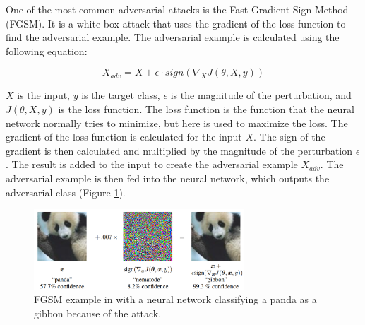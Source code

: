 One of the most common adversarial attacks is the Fast Gradient Sign Method (FGSM)\cite{goodfellow2015explaining}. It is a white-box attack that uses the gradient of the loss function to find the adversarial example. The adversarial example is calculated using the following equation:

\begin{equation}
    X_{adv} = X + \epsilon \cdot sign(\nabla_{X}J(\theta, X, y))
\end{equation}

$X$ is the input, $y$ is the target class, $\epsilon$ is the magnitude of the perturbation, and $J(\theta, X, y)$ is the loss function. The loss function is the function that the neural network normally tries to minimize, but here is used to maximize the loss. The gradient of the loss function is calculated for the input $X$. The sign of the gradient is then calculated and multiplied by the magnitude of the perturbation $\epsilon$. The result is added to the input to create the adversarial example $X_{adv}$. The adversarial example is then fed into the neural network, which outputs the adversarial class (Figure \ref*{fig:fgsm}).

\begin{figure}[H]
    \centering
    \includegraphics[width=0.7\textwidth]{../Images/fgsm.png}
    \caption{FGSM example in \cite{goodfellow2015explaining} with a neural network classifying a panda as a gibbon because of the attack.}
    \label{fig:fgsm}
\end{figure}
